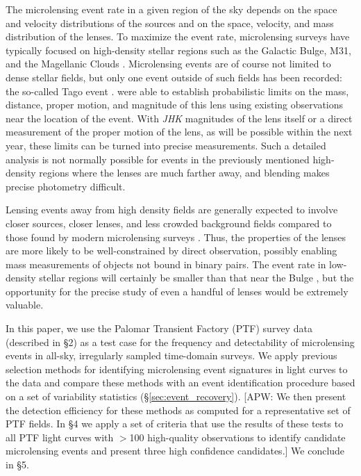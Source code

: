 \documentclass[12pt,preprint]{aastex}
\begin{document}
The microlensing event rate in a given region of the sky depends on the space and velocity distributions of the sources and on the space, velocity, and mass distribution of the lenses. To maximize the event rate, microlensing surveys have typically focused on high-density stellar regions such as the Galactic Bulge, M31, and the Magellanic Clouds \citep[e.g.][]{original_ogle, original_macho, eros_original, crotts1996}. Microlensing events are of course not limited to dense stellar fields, but only one event outside of such fields has been recorded: the so-called Tago event \citep{fukui2007, gaudi2008}. \cite{gaudi2008} were able to establish probabilistic limits on the mass, distance, proper motion, and magnitude of this lens using existing observations near the location of the event. With \textit{JHK} magnitudes of the lens itself or a direct measurement of the proper motion of the lens, as will be possible within the next year, these limits can be turned into precise measurements. Such a detailed analysis is not normally possible for events in the previously mentioned high-density regions where the lenses are much farther away, and blending makes precise photometry difficult. 

Lensing events away from high density fields are generally expected to involve closer sources, closer lenses, and less crowded background fields compared to those found by modern microlensing surveys \citep{mesolensing}. Thus, the properties of the lenses are more likely to be well-constrained by direct observation, possibly enabling mass measurements of objects not bound in binary pairs. The event rate in low-density stellar regions will certainly be smaller than that near the Bulge \citep[e.g.,][]{wood_optical_depth, ogle_optical_depth, macho_optical_depth, eros_optical_depth}, but the opportunity for the precise study of even a handful of lenses would be extremely valuable. 

In this paper, we use the Palomar Transient Factory (PTF) survey data (described in \S2) as a test case for the frequency and detectability of microlensing events in all-sky, irregularly sampled time-domain surveys. We apply previous selection methods for identifying microlensing event signatures in light curves to the data and compare these methods with an event identification procedure based on a set of variability statistics (\S\ref{sec:event_recovery}). [APW: We then present the detection efficiency for these methods as computed for a representative set of PTF fields. In \S4 we apply a set of criteria that use the results of these tests to all PTF light curves with $>$100 high-quality observations to identify candidate microlensing events and present three high confidence candidates.] We conclude in \S5.
\end{document}

